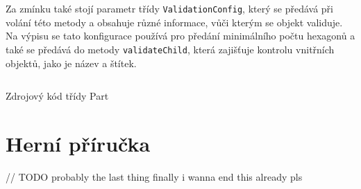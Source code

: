 Za zmínku také stojí parametr třídy  \texttt{ValidationConfig}, který se předává při volání této metody a obsahuje různé informace, vůči kterým se objekt validuje. Na výpisu se tato konfigurace používá pro předání minimálního počtu hexagonů a také se předává do metody \texttt{validateChild}, která zajišťuje kontrolu vnitřních objektů, jako je název a štítek.

\begin{listing}[H]
    \inputminted{Java}{code/Part.java}
    \caption{Zdrojový kód třídy Part}
    \label{code:part}
\end{listing}

\newpage
\section{Herní příručka}
\label{sec:game_manual}

// TODO probably the last thing finally i wanna end this already pls

